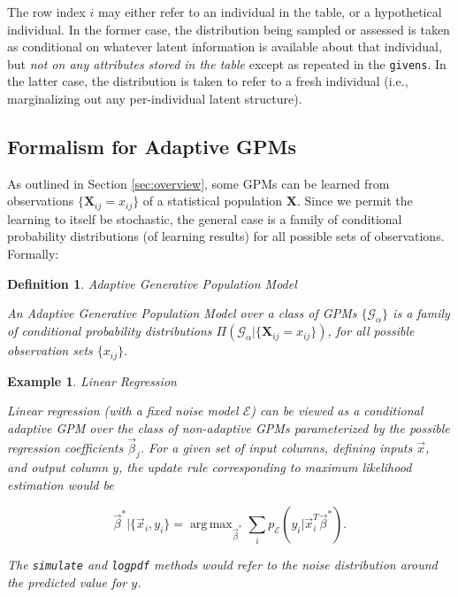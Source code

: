 \documentclass[10pt,letterpaper]{article}
\newtheorem{example}{Example}[section]
\newtheorem{definition}{Definition}[section]
\DeclareMathOperator{\argmax}{arg\,max}
\newcommand{\set}[1]{\{#1\}}
\newcommand{\G}{\mathcal{G}}
\begin{document}
The row index $i$ may either refer to an individual in the
table, or a hypothetical individual.  In the former case, the
distribution being sampled or assessed is taken as conditional on
whatever latent information is available about that individual, but
\emph{not on any attributes stored in the table} except as repeated in
the \texttt{givens}.  In the latter case, the distribution is taken to
refer to a fresh individual (i.e., marginalizing out any
per-individual latent structure).

\subsection{Formalism for Adaptive GPMs}
\label{sec:formalism-adaptive-gpm}

As outlined in Section \ref{sec:overview}, some GPMs can be learned
from observations $\set{\mathbf{X}_{ij} = x_{ij}}$ of a statistical population
$\mathbf{X}$.  Since we permit the learning to itself be stochastic,
the general case is a family of conditional probability distributions
(of learning results) for all possible sets of observations.  Formally:

\begin{definition} Adaptive Generative Population Model

An \emph{Adaptive Generative Population Model} over a class of GPMs
$\{\G_\alpha\}$ is a family of conditional probability distributions
$\Pi(\G_\alpha|\{\mathbf{X}_{ij} = x_{ij}\})$, for all possible
observation sets $\{x_{ij}\}$.
\end{definition}

\begin{example} Linear Regression

Linear regression (with a fixed noise model $\mathcal{E}$) can be viewed as a
conditional adaptive GPM over the class of non-adaptive GPMs
parameterized by the possible regression coefficients $\vec\beta_j$.
For a given set of input columns, defining inputs $\vec x$, and output column $y$,
the update rule corresponding to maximum likelihood estimation would be

\[ \vec\beta^*|\{\vec x_i, y_i\} = \argmax_{\vec\beta^*} \sum_i
   p_{\mathcal{E}}(y_i | \vec x_i^T \vec\beta^*). \]

The {\tt simulate} and {\tt logpdf} methods would refer to the
noise distribution around the predicted value for $y$.
\end{example}
\end{document}
